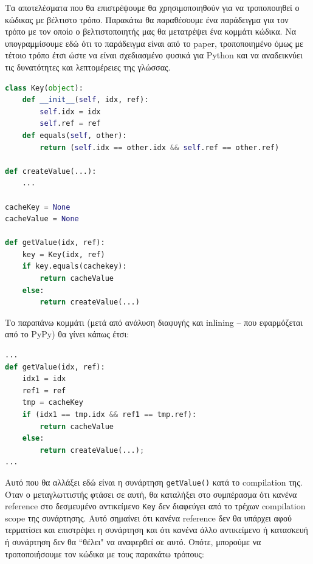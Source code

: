 Τα αποτελέσματα που θα επιστρέψουμε θα χρησιμοποιηθούν για να τροποποιηθεί ο
κώδικας με βέλτιστο τρόπο. Παρακάτω θα παραθέσουμε ένα παράδειγμα για τον τρόπο
με τον οποίο ο βελτιστοποιητής μας θα μετατρέψει ένα κομμάτι κώδικα. Να
υπογραμμίσουμε εδώ ότι το παράδειγμα είναι από το paper, τροποποιημένο όμως με
τέτοιο τρόπο έτσι ώστε να είναι σχεδιασμένο φυσικά για Python και να αναδεικνύει
τις δυνατότητες και λεπτομέρειες της γλώσσας.

\begin{lstlisting}[language=Python]
class Key(object):
    def __init__(self, idx, ref):
        self.idx = idx
        self.ref = ref
    def equals(self, other):
        return (self.idx == other.idx && self.ref == other.ref)

def createValue(...):
    ...
        
cacheKey = None
cacheValue = None

def getValue(idx, ref):
    key = Key(idx, ref)
    if key.equals(cachekey):
        return cacheValue
    else:
        return createValue(...)
\end{lstlisting}

Το παραπάνω κομμάτι (μετά από ανάλυση διαφυγής και inlining – που εφαρμόζεται
από το PyPy) θα γίνει κάπως έτσι:

\begin{lstlisting}[language=Python]
...
def getValue(idx, ref):
    idx1 = idx
    ref1 = ref
    tmp = cacheKey
    if (idx1 == tmp.idx && ref1 == tmp.ref):
        return cacheValue
    else:
        return createValue(...);
...

\end{lstlisting}

Αυτό που θα αλλάξει εδώ είναι η συνάρτηση \texttt{getValue()} κατά το
compilation της. Όταν ο μεταγλωττιστής φτάσει σε αυτή, θα καταλήξει στο
συμπέρασμα ότι κανένα reference στο δεσμευμένο αντικείμενο \texttt{Key} δεν
διαφεύγει από το τρέχων compilation scope της συνάρτησης. Αυτό σημαίνει ότι
κανένα reference δεν θα υπάρχει αφού τερματίσει και επιστρέψει η συνάρτηση και
ότι κανένα άλλο αντικείμενο ή κατασκευή ή συνάρτηση δεν θα ``θέλει" να αναφερθεί
σε αυτό. Οπότε, μπορούμε να τροποποιήσουμε τον κώδικα με τους παρακάτω τρόπους:


